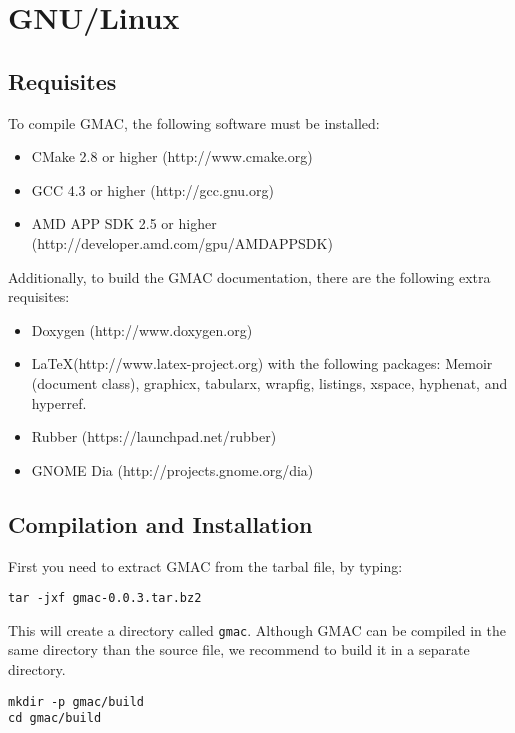 \section{GNU\slash Linux}

\subsection{Requisites}

To compile GMAC, the following software must be installed:
\begin{itemize}
\item CMake 2.8 or higher (http://www.cmake.org)
\item GCC 4.3 or higher (http://gcc.gnu.org)
\item AMD APP SDK 2.5 or higher (http://developer.amd.com/gpu/AMDAPPSDK)
\end{itemize}

Additionally, to build the GMAC documentation, there are the following extra requisites:
\begin{itemize}
\item Doxygen (http://www.doxygen.org)
\item \LaTeX (http://www.latex-project.org) with the following packages: Memoir (document class), 
graphicx, tabularx, wrapfig, listings, xspace, hyphenat, and hyperref.
\item Rubber (https://launchpad.net/rubber)
\item GNOME Dia (http://projects.gnome.org/dia)
\end{itemize}

\subsection{Compilation and Installation}
First you need to extract GMAC from the tarbal file, by typing:
\begin{verbatim}
tar -jxf gmac-0.0.3.tar.bz2
\end{verbatim}
This will create a directory called \texttt{gmac}. Although GMAC can be compiled in the same 
directory than the source file, we recommend to build it in a separate directory.
\begin{verbatim}
mkdir -p gmac/build
cd gmac/build
\end{verbatim}

